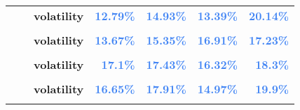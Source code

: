 \documentclass[
  authoryear,
  preprint,
  3p]{elsarticle}
\begin{document}
\begin{longtable}[t]{>{}l>{}l>{}l>{}r>{}r>{}r>{}r}
\textbf{} & \textbf{} & \textbf{volatility} & \textcolor[HTML]{4285f4}{\textbf{12.79\%}} & \textcolor[HTML]{4285f4}{\textbf{14.93\%}} & \textcolor[HTML]{4285f4}{\textbf{13.39\%}} & \textcolor[HTML]{4285f4}{\textbf{20.14\%}}\\
\addlinespace
\textbf{\cellcolor{gray!10}{}} & \textbf{\cellcolor{gray!10}{contango}} & \textbf{\cellcolor{gray!10}{mean}} & \textcolor[HTML]{4285f4}{\textbf{\cellcolor{gray!10}{-0.81\%}}} & \textcolor[HTML]{4285f4}{\textbf{\cellcolor{gray!10}{-5.49\%}}} & \textcolor[HTML]{4285f4}{\textbf{\cellcolor{gray!10}{7.28\%}}} & \textcolor[HTML]{4285f4}{\textbf{\cellcolor{gray!10}{-3.12\%}}}\\
\textbf{} & \textbf{} & \textbf{volatility} & \textcolor[HTML]{4285f4}{\textbf{13.67\%}} & \textcolor[HTML]{4285f4}{\textbf{15.35\%}} & \textcolor[HTML]{4285f4}{\textbf{16.91\%}} & \textcolor[HTML]{4285f4}{\textbf{17.23\%}}\\
\textbf{\cellcolor{gray!10}{Cattle-live (XCME)}} & \textbf{\cellcolor{gray!10}{whole period}} & \textbf{\cellcolor{gray!10}{mean}} & \textcolor[HTML]{4285f4}{\textbf{\cellcolor{gray!10}{3.45\%}}} & \textcolor[HTML]{4285f4}{\textbf{\cellcolor{gray!10}{8.77\%}}} & \textcolor[HTML]{4285f4}{\textbf{\cellcolor{gray!10}{4.13\%}}} & \textcolor[HTML]{4285f4}{\textbf{\cellcolor{gray!10}{1.92\%}}}\\
\textbf{} & \textbf{} & \textbf{volatility} & \textcolor[HTML]{4285f4}{\textbf{17.1\%}} & \textcolor[HTML]{4285f4}{\textbf{17.43\%}} & \textcolor[HTML]{4285f4}{\textbf{16.32\%}} & \textcolor[HTML]{4285f4}{\textbf{18.3\%}}\\
\textbf{\cellcolor{gray!10}{}} & \textbf{\cellcolor{gray!10}{backwardation}} & \textbf{\cellcolor{gray!10}{mean}} & \textcolor[HTML]{4285f4}{\textbf{\cellcolor{gray!10}{8.39\%}}} & \textcolor[HTML]{4285f4}{\textbf{\cellcolor{gray!10}{14.2\%}}} & \textcolor[HTML]{4285f4}{\textbf{\cellcolor{gray!10}{5.87\%}}} & \textcolor[HTML]{4285f4}{\textbf{\cellcolor{gray!10}{-2.07\%}}}\\
\addlinespace
\textbf{} & \textbf{} & \textbf{volatility} & \textcolor[HTML]{4285f4}{\textbf{16.65\%}} & \textcolor[HTML]{4285f4}{\textbf{17.91\%}} & \textcolor[HTML]{4285f4}{\textbf{14.97\%}} & \textcolor[HTML]{4285f4}{\textbf{19.9\%}}\\
\textbf{\cellcolor{gray!10}{}} & \textbf{\cellcolor{gray!10}{contango}} & \textbf{\cellcolor{gray!10}{mean}} & \textcolor[HTML]{4285f4}{\textbf{\cellcolor{gray!10}{-0.34\%}}} & \textcolor[HTML]{4285f4}{\textbf{\cellcolor{gray!10}{3.43\%}}} & \textcolor[HTML]{4285f4}{\textbf{\cellcolor{gray!10}{2.7\%}}} & \textcolor[HTML]{4285f4}{\textbf{\cellcolor{gray!10}{5.82\%}}}\\

\end{longtable}
\end{document}
